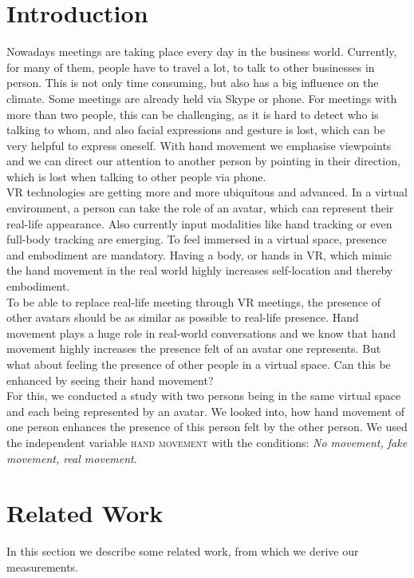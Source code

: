 \documentclass[english,runningheads,a4paper]{llncs}[2018/03/10]
\begin{document}
\section{Introduction}\label{sec:intro}
Nowadays meetings are taking place every day in the business world. 
Currently, for many of them, people have to travel a lot, to talk to other businesses in person. 
This is not only time consuming, but also has a big influence on the climate. Some meetings are already held via Skype or phone.
For meetings with more than two people, this can be challenging, as it is hard to detect who is talking to whom, and also facial expressions and gesture is lost, which can be very helpful to express oneself. 
With hand movement we emphasise viewpoints and we can direct our attention to another person by pointing in their direction, which is lost when talking to other people via phone. \\ \linebreak
VR technologies are getting more and more ubiquitous and advanced. 
In a virtual environment, a person can take the role of an avatar, which can represent their real-life appearance. 
Also currently input modalities like hand tracking or even full-body tracking are emerging.
To feel immersed in a virtual space, presence and embodiment are mandatory. 
Having a body, or hands in VR, which mimic the hand movement in the real world highly increases self-location and thereby embodiment. \\ \linebreak
To be able to replace real-life meeting through VR meetings, the presence of other avatars should be as similar as possible to real-life presence. 
Hand movement plays a huge role in real-world conversations and we know that hand movement highly increases the presence felt of an avatar one represents. 
But what about feeling the presence of other people in a virtual space. 
Can this be enhanced by seeing their hand movement? \\ \linebreak
For this, we conducted a study with two persons being in the same virtual space and each being represented by an avatar. 
We looked into, how hand movement of one person enhances the presence of this person felt by the other person.
We used the independent variable \textsc{hand movement} with the conditions: \textit{No movement, fake movement, real movement}.


\section{Related Work}
\label{sec:relatedwork}
In this section we describe some related work, from which we derive our measurements. 
\end{document}
